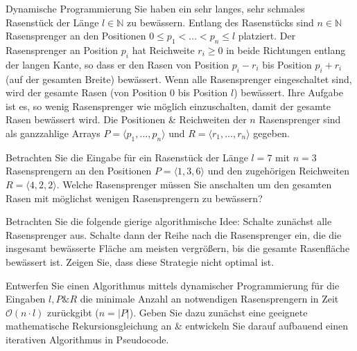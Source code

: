 \documentclass{exercisesheet}
\begin{document}
\begin{eexercises}{Dynamische Programmierung}{
    Sie haben ein sehr langes, sehr schmales Rasenstück der Länge $l \in \mathbb{N}$ zu bewässern. Entlang des Rasenstücks sind $n \in \mathbb{N}$ Rasensprenger an den Positionen $0 \leq p_1 < \ldots < p_n \leq l$ platziert. Der Rasensprenger an Position $p_i$ hat Reichweite $r_i \geq 0$ in beide Richtungen entlang der langen Kante, so dass er den Rasen von Position $p_i - r_i$ bis Position $p_i + r_i$ (auf der gesamten Breite) bewässert. Wenn alle Rasensprenger eingeschaltet sind, wird der gesamte Rasen (von Position 0 bis Position $l$) bewässert. Ihre Aufgabe ist es, so wenig Rasensprenger wie möglich einzuschalten, damit der gesamte Rasen bewässert wird. Die Positionen \& Reichweiten der $n$ Rasensprenger sind als ganzzahlige Arrays $P = \langle p_1, \ldots, p_n \rangle$ und $R = \langle r_1, \ldots, r_n \rangle$ gegeben.
  }
  \item Betrachten Sie die Eingabe für ein Rasenstück der Länge $l = 7$ mit $n = 3$ Rasensprengern an den Positionen $P = \langle 1,3,6 \rangle$ und den zugehörigen Reichweiten $R = \langle 4,2,2 \rangle$. Welche Rasensprenger müssen Sie anschalten um den gesamten Rasen mit möglichst wenigen Rasensprengern zu bewässern?
  \item Betrachten Sie die folgende gierige algorithmische Idee: Schalte zunächst alle Rasensprenger aus. Schalte dann der Reihe nach die Rasensprenger ein, die die insgesamt bewässerte Fläche am meisten vergrößern, bis die gesamte Rasenfläche bewässert ist. Zeigen Sie, dass diese Strategie nicht optimal ist.
  \item Entwerfen Sie einen Algorithmus mittels dynamischer Programmierung für die Eingaben $l, P \& R$ die minimale Anzahl an notwendigen Rasensprengern in Zeit $\mathcal{O}(n \cdot l)$ zurückgibt ($n = \lvert P \rvert$). Geben Sie dazu zunächst eine geeignete mathematische Rekursionsgleichung an \& entwickeln Sie darauf aufbauend einen iterativen Algorithmus in Pseudocode.
\end{eexercises}



\end{document}

